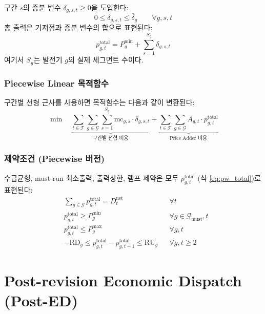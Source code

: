 \documentclass[11pt, a4paper]{article}
\begin{document}
구간 $s$의 증분 변수 $\delta_{g,s,t} \geq 0$을 도입한다:
\begin{equation}\label{eq:pw_var}
    0 \leq \delta_{g,s,t} \leq \bar{\delta}_g \qquad \forall g, s, t
\end{equation}
총 출력은 기저점과 증분 변수의 합으로 표현된다:
\begin{equation}\label{eq:pw_total}
    p_{g,t}^{\text{total}} = P_g^{\min} + \sum_{s=1}^{S_g} \delta_{g,s,t}
\end{equation}
여기서 $S_g$는 발전기 $g$의 실제 세그먼트 수이다.

\subsubsection{Piecewise Linear 목적함수}

구간별 선형 근사를 사용하면 목적함수는 다음과 같이 변환된다:
\begin{equation}\label{eq:pw_obj}
    \boxed{\min \quad \underbrace{\sum_{t \in \mathcal{T}} \sum_{g \in \mathcal{G}} \sum_{s=1}^{S_g} \text{mc}_{g,s} \cdot \delta_{g,s,t}}_{\text{구간별 선형 비용}}
    + \underbrace{\sum_{t \in \mathcal{T}} \sum_{g \in \mathcal{G}} A_{g,t} \cdot p_{g,t}^{\text{total}}}_{\text{Price Adder 비용}}}
\end{equation}

\subsubsection{제약조건 (Piecewise 버전)}

수급균형, must-run 최소출력, 출력상한, 램프 제약은 모두
$p_{g,t}^{\text{total}}$ (식 \eqref{eq:pw_total})로 표현된다:
\begin{align}
    &\sum_{g \in \mathcal{G}} p_{g,t}^{\text{total}} = D_t^{\text{net}} && \forall t \label{eq:pw_balance} \\
    &p_{g,t}^{\text{total}} \geq P_g^{\min} && \forall g \in \mathcal{G}_{\text{must}}, t \label{eq:pw_must} \\
    &p_{g,t}^{\text{total}} \leq P_g^{\max} && \forall g, t \\
    &-\text{RD}_g \leq p_{g,t}^{\text{total}} - p_{g,t-1}^{\text{total}} \leq \text{RU}_g && \forall g, t \geq 2 \label{eq:pw_ramp}
\end{align}


\section{Post-revision Economic Dispatch (Post-ED)}\label{sec:post_ed}
\end{document}
